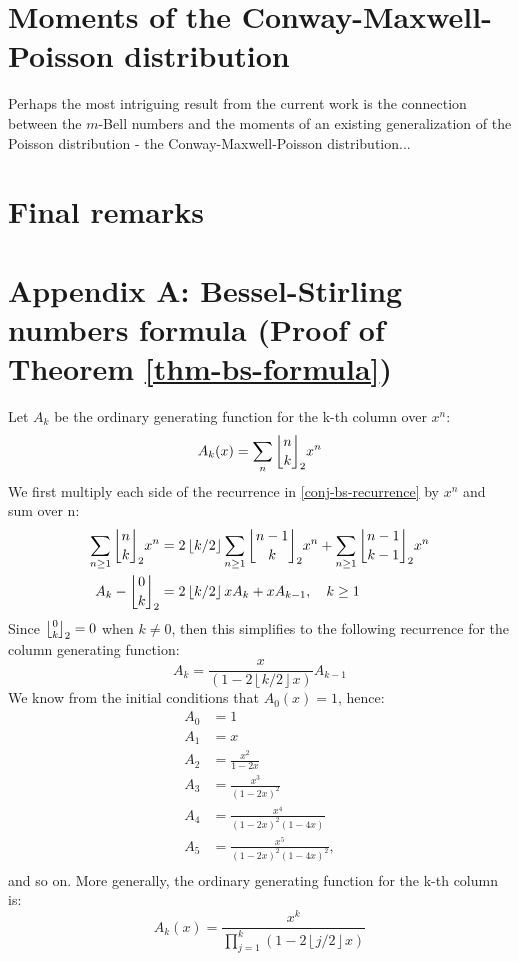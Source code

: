\documentclass[a4paper]{amsart}
\newcommand{\mStirling}[0]{\genfrac{\lfloor}{\rfloor}{0pt}{}}
\newcommand{\floor}[1]{\left\lfloor #1 \right\rfloor}
\begin{document}
\section{Moments of the Conway-Maxwell-Poisson distribution}\label{sec-cmp}

Perhaps the most intriguing result from the current work is the connection between the $m$-Bell numbers and the moments of an existing generalization of the Poisson distribution - the Conway-Maxwell-Poisson distribution...

\section{Final remarks}\label{sec-final-remarks}

\pagebreak

\section*{Appendix A: Bessel-Stirling numbers formula (Proof of Theorem \ref{thm-bs-formula})}
Let $A_k$ be the ordinary generating function for the k-th column over $x^n$:
$$
A_k(x) = \sum_{n} \mStirling{n}{k}_2 x^n
$$
We first multiply each side of the recurrence in \ref{conj-bs-recurrence} by $x^n$ and sum over n:
$$
\begin{aligned}
\sum_{n \geq 1} \mStirling{n}{k}_2x^n &= 2\floor{k/2}\sum_{n \geq 1}\mStirling{n-1}{k}_2x^n + \sum_{n \geq 1} \mStirling{n-1}{k-1}_2 x^n \\
A_k -\mStirling{0}{k}_2&=2\floor{k/2}x A_k+x A_{k-1}, \quad k \geq 1
\end{aligned}
$$
Since $\mStirling{0}{k}_2 = 0$ when $k \neq 0$, then this simplifies to the following recurrence for the column generating function:
$$
A_k = \frac{x}{(1-2\floor{k/2}x)} A_{k-1}
$$
We know from the initial conditions that $A_0(x) = 1$, hence:
$$
\begin{aligned}
    A_0 &= 1 \\
    A_1 &= x \\
    A_2 &= \frac{x^2}{1-2x} \\
    A_3 &= \frac{x^3}{(1-2x)^2} \\
    A_4 &= \frac{x^4}{(1-2x)^2 (1-4x)} \\
    A_5 &= \frac{x^5}{(1-2x)^2 (1-4x)^2}, \\
\end{aligned}
$$
and so on. More generally, the ordinary generating function for the k-th column is:
\begin{equation}\label{column-ogf}
A_k(x) = \frac{x^k}{\prod_{j=1}^k(1-2\floor{j/2}x)}
\end{equation}
\end{document}
